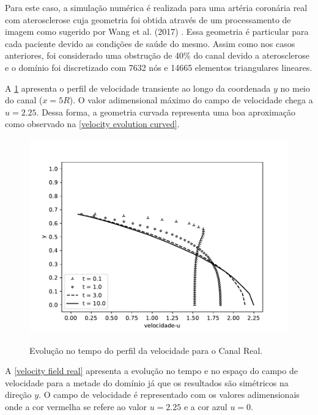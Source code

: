 Para este caso, a simulação numérica é realizada para uma artéria coronária
real com aterosclerose cuja geometria foi obtida através de um processamento de imagem
como sugerido por Wang et al. (2017) \cite{wang2017}. Essa geometria é particular para
cada paciente devido as condições de saúde do mesmo. 
Assim como nos casos anteriores, foi considerado uma obstrução
de 40\% do canal devido a aterosclerose e o domínio foi
discretizado com 7632 nós e 14665 elementos triangulares lineares. \par
A \ref{velocity evolution real} apresenta o perfil
de velocidade transiente ao longo da coordenada $y$ no
meio do canal ($x=5R$). 
O valor adimensional máximo do campo de velocidade chega
a $u=2.25$. Dessa forma, a geometria curvada representa
uma boa aproximação como observado na \ref{velocity evolution curved}.



\begin{figure}[H]
     \centering
     \includegraphics[scale=1]{./02_chaps/cap_solution/figure/vel_Real_evol.pdf}\\
     \caption{Evolução no tempo do perfil da velocidade para o Canal Real.}
     \label{velocity evolution real}
\end{figure}

\newpage
A \ref{velocity field real} apresenta a evolução no tempo e no espaço
do campo de velocidade para a metade do domínio já que os resultados são simétricos
na direção $y$. O campo de velocidade é representado com os valores adimensionais
onde a cor vermelha se refere ao valor $u=2.25$ e a cor azul $u=0$.

